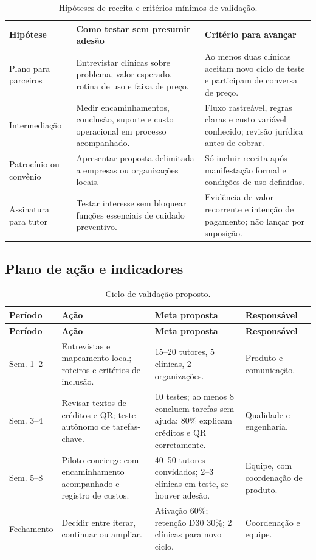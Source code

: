 \documentclass[12pt,a4paper]{article}
\begin{document}
\begin{table}[H]
\centering
\small
\caption{Hipóteses de receita e critérios mínimos de validação.}
\begin{tabularx}{\textwidth}{P{3.0cm}YY}
\toprule
\textbf{Hipótese} & \textbf{Como testar sem presumir adesão} & \textbf{Critério para avançar} \\
\midrule
Plano para parceiros & Entrevistar clínicas sobre problema, valor esperado, rotina de uso e faixa de preço. & Ao menos duas clínicas aceitam novo ciclo de teste e participam de conversa de preço. \\
Intermediação & Medir encaminhamentos, conclusão, suporte e custo operacional em processo acompanhado. & Fluxo rastreável, regras claras e custo variável conhecido; revisão jurídica antes de cobrar. \\
Patrocínio ou convênio & Apresentar proposta delimitada a empresas ou organizações locais. & Só incluir receita após manifestação formal e condições de uso definidas. \\
Assinatura para tutor & Testar interesse sem bloquear funções essenciais de cuidado preventivo. & Evidência de valor recorrente e intenção de pagamento; não lançar por suposição. \\
\bottomrule
\end{tabularx}
\end{table}

\subsection{Plano de ação e indicadores}

\begin{longtable}{P{1.8cm}P{4.2cm}P{4.0cm}P{2.7cm}}
\caption{Ciclo de validação proposto.}\label{tab:plano}\\
\toprule
\textbf{Período} & \textbf{Ação} & \textbf{Meta proposta} & \textbf{Responsável} \\
\midrule
\endfirsthead
\toprule
\textbf{Período} & \textbf{Ação} & \textbf{Meta proposta} & \textbf{Responsável} \\
\midrule
\endhead
Sem. 1--2 & Entrevistas e mapeamento local; roteiros e critérios de inclusão. & 15--20 tutores, 5 clínicas, 2 organizações. & Produto e comunicação. \\
Sem. 3--4 & Revisar textos de créditos e QR; teste autônomo de tarefas-chave. & 10 testes; ao menos 8 concluem tarefas sem ajuda; 80\% explicam créditos e QR corretamente. & Qualidade e engenharia. \\
Sem. 5--8 & Piloto concierge com encaminhamento acompanhado e registro de custos. & 40--50 tutores convidados; 2--3 clínicas em teste, se houver adesão. & Equipe, com coordenação de produto. \\
Fechamento & Decidir entre iterar, continuar ou ampliar. & Ativação 60\%; retenção D30 30\%; 2 clínicas para novo ciclo. & Coordenação e equipe. \\
\bottomrule
\end{longtable}
\end{document}
